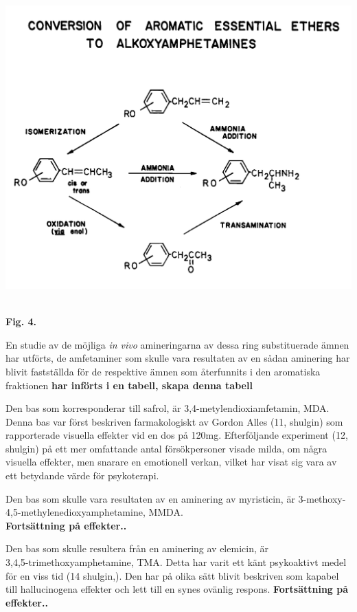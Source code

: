 \documentclass[a4paper,margin=3.25cm]{article}
\begin{document}
{	\hbox{\hspace{0cm}\includegraphics[scale=0.1125]{Figure4}
	}
	\begin{center}\textbf{Fig. 4.}\end{center}


	En studie av de möjliga \textit{in vivo} amineringarna av dessa ring substituerade
	ämnen har utförts, de amfetaminer som skulle vara resultaten av en sådan
	aminering har blivit fastställda för de respektive ämnen som återfunnits
	i den aromatiska fraktionen \textbf{har införts i en tabell, skapa denna tabell}

	Den bas som korresponderar till safrol, är 3,4-metylendioxiamfetamin, MDA.
	Denna bas var först beskriven farmakologiskt av Gordon Alles (11, shulgin) som
	rapporterade visuella effekter vid en dos på 120mg. Efterföljande experiment
	(12, shulgin) på ett mer omfattande antal försökpersoner visade milda, om några
	visuella effekter, men snarare en emotionell verkan, vilket har visat sig
	vara av ett betydande värde för psykoterapi.

	Den bas som skulle vara resultaten av en aminering av myristicin, är
	3-methoxy-4,5-methylenedioxyamphetamine, MMDA. \\
	\textbf{Fortsättning på effekter..}

	Den bas som skulle resultera från en aminering av elemicin, är \\
	3,4,5-trimethoxyamphetamine, TMA. Detta har varit ett känt psykoaktivt medel
	för en viss tid (14 shulgin,).
	Den har på olika sätt blivit beskriven som kapabel till hallucinogena effekter
	och lett till en synes ovänlig respons. \cite{shulgin1995pihkal}
	\textbf{Fortsättning på effekter..}



}
\end{document}
